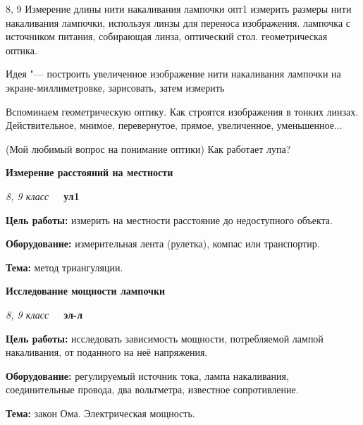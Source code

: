 \documentclass[a4paper,10pt]{article}
\newcommand{\labtitle}[7]{
	\textbf{#2}\par
	\textit{#1 класс}~~~\textbf{#3}\par
	\textbf{Цель работы:} #4\par
	\textbf{Оборудование:} #5\par
	\textbf{Тема:} #6
}
\begin{document}
\begin{enumerate}
		{8, 9}
		{Измерение длины нити накаливания лампочки}
		{опт1}
		{измерить размеры нити накаливания лампочки, используя линзы для переноса изображения.}
		{лампочка с источником питания, собирающая линза, оптический стол.}
		{геометрическая оптика.}
		{\item Идея "--- построить увеличенное изображение нити накаливания лампочки на экране-миллиметровке, зарисовать, затем измерить
		\item Вспоминаем геометрическую оптику. Как строятся изображения в тонких линзах. Действительное, мнимое, перевернутое, прямое, увеличенное, уменьшенное...
		\item (Мой любимый вопрос на понимание оптики) Как работает лупа?}
	\item \labtitle
		{8, 9}
		{Измерение расстояний на местности}
		{ул1}
		{измерить на местности расстояние до недоступного объекта.}
		{измерительная лента (рулетка), компас или транспортир.}
		{метод триангуляции.}
		{\item Некоторая вытянутая территория "--- это <<пол>>. Остальное "--- лава. Нужно определить расстояние от одного из концов пола до объекта в <<лаве>>. Например, южное крыльцо лаб "--- <<пол>>, а всё остальное пространство лагеря "--- <<лава>>. А определить нужно расстояние, скажем, до ногомойки.
        \item Суть работы "--- решение треугольника. На <<полу>> располагаются две вершины (одна сторона). Третья вершина "--- недоступный объект. При помощи транспортира или компаса (через азимут) определяются углы между сторонами, при помощи длинной рулетки определяется длина стороны на <<полу>>.}
	\item \labtitle
		{8, 9}
		{Исследование мощности лампочки}
		{эл-л}
		{исследовать зависимость мощности, потребляемой лампой накаливания, от поданного на неё напряжения.}
		{регулируемый источник тока, лампа накаливания, соединительные провода, два вольтметра, известное сопротивление.}
		{закон Ома. Электрическая мощность.}
		{\item По закону Джоуля-Ленца, $P=\frac{U^2}{R}$. На первый взгляд, зависимость должна быть квадратичной, и это нужно проверить, построив $P(U^2)$ (пусть попробуют сами догадаться, что график нужно строить в таких осях). Зависимость не будет чисто квадратичной, поскольку температура нити накаливания сильно меняется, а сопротивление зависит от температуры
}
\end{enumerate}
\end{document}
